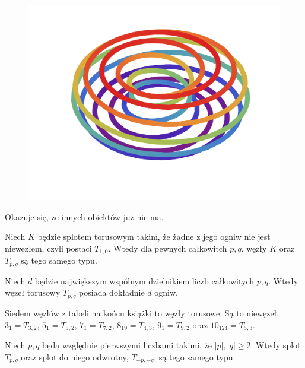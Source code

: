 \begin{figure}[H]
\begin{minipage}[b]{.3\linewidth}
        \centering
        \includegraphics[width=\linewidth]{../data/torus-p11-q2.pdf}
    \end{minipage}
\end{figure}


Okazuje się, że innych obiektów już nie ma.

\begin{proposition}
    Niech $K$ będzie splotem torusowym takim, że żadne z jego ogniw nie jest niewęzłem, czyli postaci $T_{1, 0}$.
    Wtedy dla pewnych całkowitch $p, q$, węzły $K$ oraz $T_{p, q}$ są tego samego typu.
\end{proposition}

\begin{proposition}
    Niech $d$ będzie największym wspólnym dzielnikiem liczb całkowitych $p, q$.
    Wtedy węzeł torusowy $T_{p, q}$ posiada dokładnie $d$ ogniw.
\end{proposition}

Siedem węzłów z tabeli na końcu książki to węzły torusowe.
Są to niewęzeł, $3_1 = T_{3,2}$, $5_1 = T_{5,2}$, $7_1 = T_{7,2}$, $8_{19} = T_{4,3}$, $9_1 = T_{9,2}$ oraz $10_{124} = T_{5, 3}$.

\begin{proposition}
    Niech $p, q$ będą względnie pierwszymi liczbami takimi, że $|p|, |q| \ge 2$.
    Wtedy splot $T_{p, q}$ oraz splot do niego odwrotny, $T_{-p, -q}$, są tego samego typu.
\end{proposition}

